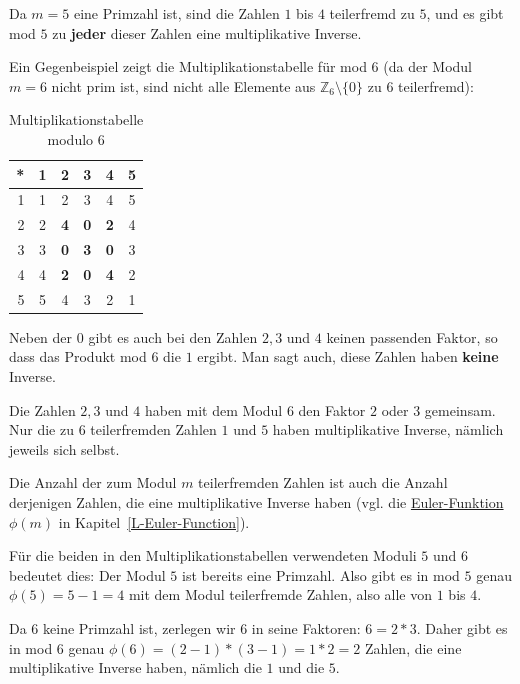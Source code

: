 \begin{refsegment}
Da $m=5$ eine Primzahl ist, sind die Zahlen $1$ bis $4$ teilerfremd zu $5$, und
es gibt mod $5$ zu {\bf jeder} dieser Zahlen eine multiplikative Inverse.

Ein Gegenbeispiel zeigt die Multiplikationstabelle für mod $6$
(da der Modul $m = 6$ nicht prim ist, sind nicht alle Elemente aus
$\mathbb{Z}_6\setminus \{0\}$ zu $6$ teilerfremd):

\begin{table}[ht]
\begin{center}
\begin{tabular}{r|ccccc}
* &  1 & 2 & 3 & 4 & 5\\
\hline
1 &  1 & 2 & 3 & 4 & 5\\
2 &  2 & {\bf 4} & {\bf 0} & {\bf 2} & 4\\
3 &  3 & {\bf 0} & {\bf 3} & {\bf 0} & 3\\
4 &  4 & {\bf 2} & {\bf 0} & {\bf 4} & 2\\
5 &  5 & 4 & 3 & 2 & 1\\
\end{tabular}
\end{center}
\caption{Multiplikationstabelle modulo $6$}
\label{mulmod6}
\end{table}


Neben der $0$ gibt es auch bei den Zahlen $2, 3$ und $4$ keinen passenden Faktor,
so dass das Produkt mod $6$ die $1$ ergibt. Man sagt auch, diese Zahlen haben
{\bf keine} Inverse.%

Die Zahlen $2, 3$ und $4$ haben mit dem Modul $6$ den Faktor $2$ oder $3$
gemeinsam.
Nur die zu $6$ teilerfremden Zahlen
$1$ und $5$ haben multiplikative Inverse, nämlich jeweils sich selbst.

Die Anzahl der zum Modul $m$ teilerfremden Zahlen ist auch die Anzahl
derjenigen Zahlen, die eine multiplikative Inverse haben (vgl. die
\hyperlink{EulerFunction}{Euler-Funktion} 
$\phi(m)$ in Kapitel~\ref{L-Euler-Function}).

Für die beiden in den Multiplikationstabellen verwendeten Moduli $5$ und $6$
bedeutet dies:
Der Modul $5$ ist bereits eine Primzahl. Also gibt es in mod $5$ genau $\phi(5) = 5 - 1 = 4$
mit dem Modul teilerfremde Zahlen, also alle von $1$ bis $4$.

Da $6$ keine Primzahl ist, zerlegen wir $6$ in seine Faktoren: $6 = 2 * 3$.
Daher gibt es in mod $6$ genau $\phi(6) = (2-1)*(3-1) = 1 * 2 = 2$ Zahlen, die eine
multiplikative Inverse haben, nämlich die $1$ und die $5$.


\end{refsegment}
